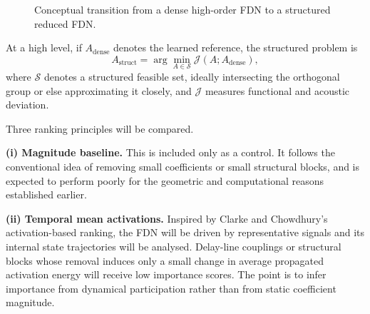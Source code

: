 \documentclass[12pt,a4paper]{article}
\begin{document}
\begin{figure}[t]
{
    }
    \caption{Conceptual transition from a dense high-order FDN to a structured reduced FDN.}
    \label{fig:densevsstructuredfdn}
\end{figure}





At a high level, if
$A_{\mathrm{dense}}$ denotes the learned reference, the structured problem is
\[
A_{\mathrm{struct}} = \arg\min_{A \in \mathcal{S}} \mathcal{J}(A;A_{\mathrm{dense}}),
\]
where $\mathcal{S}$ denotes a structured feasible set, ideally intersecting the
orthogonal group or else approximating it closely, and $\mathcal{J}$ measures
functional and acoustic deviation.

Three ranking principles will be compared.

\textbf{(i) Magnitude baseline.}
This is included only as a control. It follows the conventional idea of removing
small coefficients or small structural blocks, and is expected to perform poorly
for the geometric and computational reasons established earlier.

\textbf{(ii) Temporal mean activations.}
Inspired by Clarke and Chowdhury's activation-based ranking, the FDN will be
driven by representative signals and its internal state trajectories will be
analysed. Delay-line couplings or structural blocks whose removal induces only a
small change in average propagated activation energy will receive low
importance scores. The point is to infer importance from dynamical
participation rather than from static coefficient magnitude.
\end{document}
